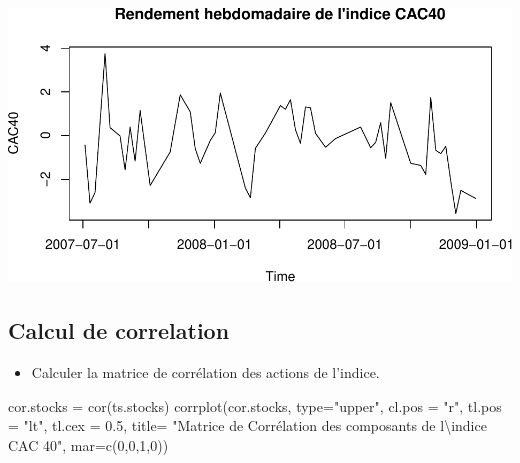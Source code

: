 \documentclass[
]{article}
\newenvironment{Shaded}{\begin{snugshade}}{\end{snugshade}}
\newcommand{\AttributeTok}[1]{\textcolor[rgb]{0.77,0.63,0.00}{#1}}
\newcommand{\DecValTok}[1]{\textcolor[rgb]{0.00,0.00,0.81}{#1}}
\newcommand{\FloatTok}[1]{\textcolor[rgb]{0.00,0.00,0.81}{#1}}
\newcommand{\FunctionTok}[1]{\textcolor[rgb]{0.00,0.00,0.00}{#1}}
\newcommand{\NormalTok}[1]{#1}
\newcommand{\OtherTok}[1]{\textcolor[rgb]{0.56,0.35,0.01}{#1}}
\newcommand{\SpecialCharTok}[1]{\textcolor[rgb]{0.00,0.00,0.00}{#1}}
\newcommand{\StringTok}[1]{\textcolor[rgb]{0.31,0.60,0.02}{#1}}
\providecommand{\tightlist}{%
  \setlength{\itemsep}{0pt}\setlength{\parskip}{0pt}}
\begin{document}
\includegraphics{TP-1_files/figure-latex/plot-cac-2-1.pdf}

\hypertarget{calcul-de-correlation}{%
\subsection{Calcul de correlation}\label{calcul-de-correlation}}

\begin{itemize}
\tightlist
\item
  Calculer la matrice de corrélation des actions de l'indice.
\end{itemize}

\begin{Shaded}
\begin{Highlighting}[]
\NormalTok{cor.stocks }\OtherTok{=} \FunctionTok{cor}\NormalTok{(ts.stocks)}
\FunctionTok{corrplot}\NormalTok{(cor.stocks, }\AttributeTok{type=}\StringTok{"upper"}\NormalTok{, }\AttributeTok{cl.pos =} \StringTok{"r"}\NormalTok{, }\AttributeTok{tl.pos =} \StringTok{"lt"}\NormalTok{, }
         \AttributeTok{tl.cex =} \FloatTok{0.5}\NormalTok{, }\AttributeTok{title=} \StringTok{"Matrice de Corrélation des composants de l}\SpecialCharTok{\textbackslash{}\textquotesingle{}}\StringTok{indice CAC 40"}\NormalTok{, }\AttributeTok{mar=}\FunctionTok{c}\NormalTok{(}\DecValTok{0}\NormalTok{,}\DecValTok{0}\NormalTok{,}\DecValTok{1}\NormalTok{,}\DecValTok{0}\NormalTok{))}
\end{Highlighting}
\end{Shaded}
\end{document}
